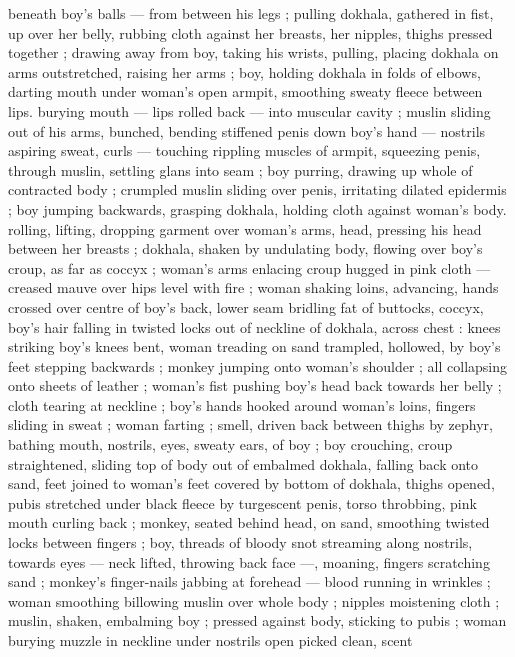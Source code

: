beneath boy's balls --- from between his legs ; pulling dokhala, 
gathered in fist, up over her belly, rubbing cloth against her breasts, 
her nipples, thighs pressed together ; drawing away from boy, taking 
his wrists, pulling, placing dokhala on arms outstretched, raising her 
arms ; boy, holding dokhala in folds of elbows, darting mouth under 
woman's open armpit, smoothing sweaty fleece between lips. 
burying mouth --- lips rolled back --- into muscular cavity ; muslin 
sliding out of his arms, bunched, bending stiffened penis down boy's 
hand --- nostrils aspiring sweat, curls --- touching rippling muscles 
of armpit, squeezing penis, through muslin, settling glans into seam 
; boy purring, drawing up whole of contracted body ; crumpled 
muslin sliding over penis, irritating dilated epidermis ; boy jumping 
backwards, grasping dokhala, holding cloth against woman's body. 
rolling, lifting, dropping garment over woman's arms, head, pressing 
his head between her breasts ; dokhala, shaken by undulating body, 
flowing over boy's croup, as far as coccyx ; woman's arms enlacing 
croup hugged in pink cloth --- creased mauve over hips level with fire 
; woman shaking loins, advancing, hands crossed over centre of 
boy's back, lower seam bridling fat of buttocks, coccyx, boy's hair 
falling in twisted locks out of neckline of dokhala, across chest : 
knees striking boy's knees bent, woman treading on sand trampled, 
hollowed, by boy's feet stepping backwards ; monkey jumping onto 
woman's shoulder ; all collapsing onto sheets of leather ; woman's 
fist pushing boy's head back towards her belly ; cloth tearing at 
neckline ; boy's hands hooked around woman's loins, fingers sliding 
in sweat ; woman farting ; smell, driven back between thighs by 
zephyr, bathing mouth, nostrils, eyes, sweaty ears, of boy ; boy 
crouching, croup straightened, sliding top of body out of embalmed 
dokhala, falling back onto sand, feet joined to woman's feet covered 
by bottom of dokhala, thighs opened, pubis stretched under black 
fleece by turgescent penis, torso throbbing, pink mouth curling back 
; monkey, seated behind head, on sand, smoothing twisted locks 
between fingers ; boy, threads of bloody snot streaming along 
nostrils, towards eyes --- neck lifted, throwing back face ---, 
moaning, fingers scratching sand ; monkey's finger-nails jabbing at 
forehead --- blood running in wrinkles ; woman smoothing billowing 
muslin over whole body ; nipples moistening cloth ; muslin, shaken, 
embalming boy ; pressed against body, sticking to pubis ; woman 
burying muzzle in neckline {\col} under nostrils open picked clean, scent 
